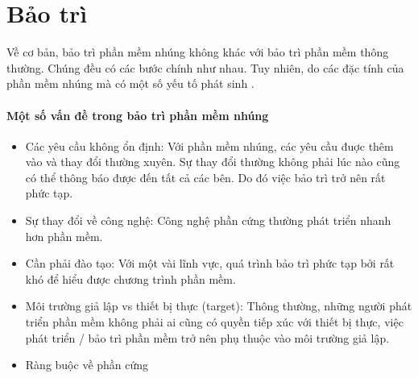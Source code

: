     \section{Bảo trì}
        Về cơ bản, bảo trì phần mềm nhúng không khác với bảo trì phần mềm thông
        thường. Chúng đều có các bước chính như nhau. Tuy nhiên, do các đặc
        tính của phần mềm nhúng mà có một số yếu tố phát sinh \cite{EmbMtn}.

        \paragraph{Một số vấn đề trong bảo trì phần mềm nhúng}
            
            \begin{itemize}
                \item Các yêu cầu không ổn định:
                    Với phần mềm nhúng, các yêu cầu đuợc thêm vào và thay đổi
                    thường xuyên. Sự thay đổi thường không phải lúc nào cũng
                    có thể thông báo được đến tất cả các bên. Do đó việc bảo trì
                    trở nên rất phức tạp.

                \item Sự thay đổi về công nghệ:
                    Công nghệ phần cứng thường phát triển nhanh hơn phần mềm.

                \item Cần phải đào tạo:
                    Với một vài lĩnh vực, quá trình bảo trì phức tạp bởi rất khó để
                    hiểu được chương trình phần mềm. 

                \item Môi trường giả lập vs thiết bị thực (target):
                    Thông thường, những người phát triển phần mềm không phải ai
                    cũng có quyền tiếp xúc với thiết bị thực, việc phát triển /
                    bảo trì
                    phần mềm trở nên phụ thuộc vào môi trường giả lập.

                \item Ràng buộc về phần cứng
            \end{itemize} 
        
                
